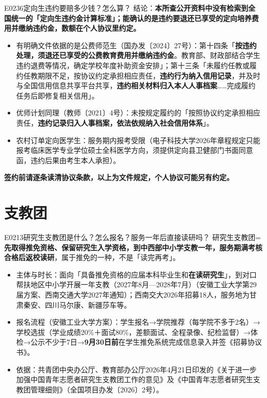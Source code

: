 \begin{qa}{E0236}{定向生违约要赔多少钱？怎么算？}
结论：\textbf{本所查公开资料中没有检索到全国统一的「定向生违约金计算标准」；能确认的是违约要退还已享受的定向培养费用并缴纳违约金，数额在个人协议里约定。}
\begin{itemize}
  \item 有明确文件依据的是公费师范生（国办发〔2024〕27号）：第十四条「\textbf{按违约处理，须退还已享受的公费教育费用并缴纳违约金}。教育部、财政部结合学生违约退费等情况，确定学校年度补助资金安排」；第十三条「未履约任教或履约任教期限不足，按协议约定承担相应责任，\textbf{违约行为纳入信用记录}，并及时与全国信用信息共享平台共享，\textbf{违约相关材料归入本人人事档案}……完成履约任务后即修复相关信用」。
  \item 优师计划同理（教师〔2021〕4号）：未按规定履约的「按照协议约定承担相应责任，\textbf{违约记录归入人事档案，依法依规纳入社会信用体系}」。
  \item 农村订单定向医学生：服务期内报考受限（电子科技大学2026年章程规定只能报考临床医学专业学位硕士全科医学方向，须提供定向县卫健部门书面同意函，违约后果由考生本人承担）。
\end{itemize}
\textbf{签约前请逐条读清协议条款，以上为文件规定，个人协议可能另有约定。}
\end{qa}

\section{支教团}
\begin{qa}{E0213}{研究生支教团是什么？怎么报名？服务一年后直接读研吗？}
研究生支教团=\textbf{先取得推免资格、保留研究生入学资格，到中西部中小学支教一年，服务期满考核合格后返校读研}，属于推免的一种，不是「读完再考」。
\begin{itemize}
  \item 主体与时长：面向「具备推免资格的应届本科毕业生和\textbf{在读研究生}」，到对口帮扶地区中小学开展一年支教（2027年8月—2028年7月）（安徽工业大学第29届方案、西南交通大学2027年通知）；西南交大2026年招募18人，服务地为甘肃秦安、四川马尔康、新疆莎车等。
  \item 报名流程（安徽工业大学方案）：学生报名→学院推荐（每学院不多于2名）→学校选拔（学业成绩20\%＋面试80\%，差额面试、全程录像、纪检监督）→体检→公示不少于7日→\textbf{9月30日前}在学生推免系统完成信息录入并签《招募协议书》。
  \item 依据：共青团中央办公厅、教育部办公厅2026年4月21日印发的《关于进一步加强中国青年志愿者研究生支教团工作的意见》及《中国青年志愿者研究生支教团管理细则》（全国项目办发〔2026〕2号）。
\end{itemize}
\end{qa}

